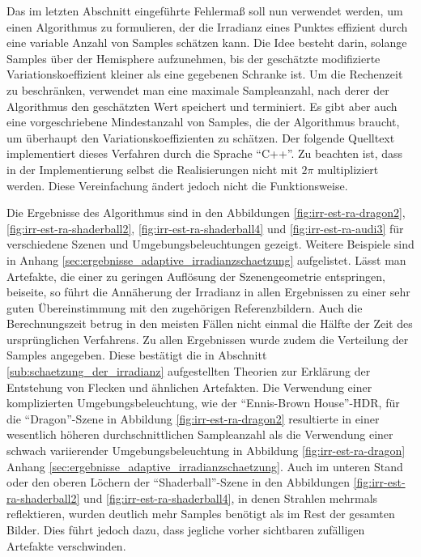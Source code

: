 		Das im letzten Abschnitt eingeführte Fehlermaß soll nun verwendet werden, um einen Algorithmus zu formulieren, der die Irradianz eines Punktes effizient durch eine variable Anzahl von Samples schätzen kann.
		Die Idee besteht darin, solange Samples über der Hemisphere aufzunehmen, bis der geschätzte modifizierte Variationskoeffizient kleiner als eine gegebenen Schranke ist.
		Um die Rechenzeit zu beschränken, verwendet man eine maximale Sampleanzahl, nach derer der Algorithmus den geschätzten Wert speichert und terminiert.
		Es gibt aber auch eine vorgeschriebene Mindestanzahl von Samples, die der Algorithmus braucht, um überhaupt den Variationskoeffizienten zu schätzen.
		Der folgende Quelltext implementiert dieses Verfahren durch die Sprache \enquote{C++}.
		Zu beachten ist, dass in der Implementierung selbst die Realisierungen nicht mit $2\pi$ multipliziert werden.
		Diese Vereinfachung ändert jedoch nicht die Funktionsweise.

		

		Die Ergebnisse des Algorithmus sind in den Abbildungen \ref{fig:irr-est-ra-dragon2}, \ref{fig:irr-est-ra-shaderball2}, \ref{fig:irr-est-ra-shaderball4} und \ref{fig:irr-est-ra-audi3} für verschiedene Szenen und Umgebungsbeleuchtungen gezeigt.
		Weitere Beispiele sind in Anhang \ref{sec:ergebnisse_adaptive_irradianzschaetzung} aufgelistet.
		Lässt man Artefakte, die einer zu geringen Auflösung der Szenengeometrie entspringen, beiseite, so führt die Annäherung der Irradianz in allen Ergebnissen zu einer sehr guten Übereinstimmung mit den zugehörigen Referenzbildern.
		Auch die Berechnungszeit betrug in den meisten Fällen nicht einmal die Hälfte der Zeit des ursprünglichen Verfahrens.
		Zu allen Ergebnissen wurde zudem die Verteilung der Samples angegeben.
		Diese bestätigt die in Abschnitt \ref{sub:schaetzung_der_irradianz} aufgestellten Theorien zur Erklärung der Entstehung von Flecken und ähnlichen Artefakten.
		Die Verwendung einer komplizierten Umgebungsbeleuchtung, wie der \enquote{Ennis-Brown House}-HDR, für die \enquote{Dragon}-Szene in Abbildung \ref{fig:irr-est-ra-dragon2} resultierte in einer wesentlich höheren durchschnittlichen Sampleanzahl als die Verwendung einer schwach variierender Umgebungsbeleuchtung in Abbildung \ref{fig:irr-est-ra-dragon} Anhang \ref{sec:ergebnisse_adaptive_irradianzschaetzung}.
		Auch im unteren Stand oder den oberen Löchern der \enquote{Shaderball}-Szene in den Abbildungen \ref{fig:irr-est-ra-shaderball2} und \ref{fig:irr-est-ra-shaderball4}, in denen Strahlen mehrmals reflektieren, wurden deutlich mehr Samples benötigt als im Rest der gesamten Bilder.
		Dies führt jedoch dazu, dass jegliche vorher sichtbaren zufälligen Artefakte verschwinden.

